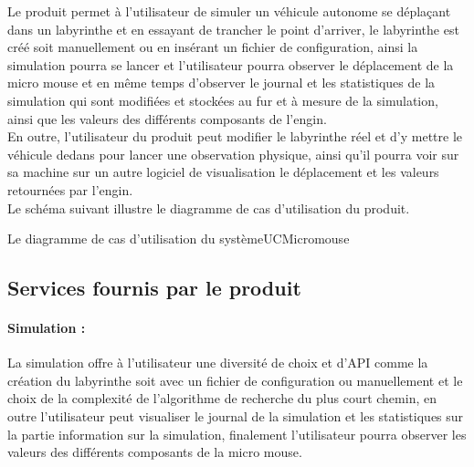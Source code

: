 \vspace{5mm}
Le produit permet à l'utilisateur de simuler un véhicule autonome se déplaçant 
dans un labyrinthe et en essayant de trancher le point d'arriver, le labyrinthe 
est créé soit manuellement ou en insérant un fichier de configuration, ainsi la 
simulation pourra se lancer et l'utilisateur pourra observer le déplacement de 
la micro mouse et en même temps d'observer le journal et les statistiques de la 
simulation qui sont modifiées et stockées au fur et à mesure de la simulation, 
ainsi que les valeurs des différents composants de l'engin. \\

En outre, l'utilisateur du produit peut modifier le labyrinthe réel et d'y mettre 
le véhicule dedans pour lancer une observation physique, ainsi qu'il pourra voir 
sur sa machine sur un autre logiciel de visualisation le déplacement et les valeurs 
retournées par l'engin. \\

Le schéma suivant illustre le diagramme de cas d'utilisation du produit.


{Le diagramme de cas d'utilisation du système}{UCMicromouse}

\subsection{Services fournis par le produit} \label{sec:serLogiciel}

\paragraph{Simulation :}La simulation offre à l'utilisateur une diversité de choix 
et d'API comme la création du labyrinthe soit avec un fichier de configuration ou 
manuellement et le choix de la complexité de l'algorithme de recherche du plus court chemin, 
en outre l'utilisateur peut visualiser le journal de la simulation et les statistiques 
sur la partie information sur la simulation, finalement l'utilisateur pourra observer 
les valeurs des différents composants de la micro mouse.



